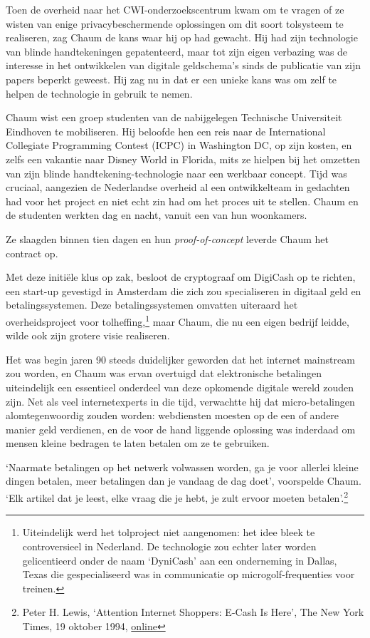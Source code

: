 \documentclass[
  a5paper,
  smalldemyvopaper,11pt,twoside,onecolumn,openright,extrafontsizes]{memoir}
\begin{document}
Toen de overheid naar het CWI-onderzoekscentrum kwam om te vragen of ze
wisten van enige privacybeschermende oplossingen om dit soort tolsysteem
te realiseren, zag Chaum de kans waar hij op had gewacht. Hij had zijn
technologie van blinde handtekeningen gepatenteerd, maar tot zijn eigen
verbazing was de interesse in het ontwikkelen van digitale geldschema's
sinds de publicatie van zijn papers beperkt geweest. Hij zag nu in dat
er een unieke kans was om zelf te helpen de technologie in gebruik te
nemen.

Chaum wist een groep studenten van de nabijgelegen Technische
Universiteit Eindhoven te mobiliseren. Hij beloofde hen een reis naar de
International Collegiate Programming Contest (ICPC) in Washington DC, op
zijn kosten, en zelfs een vakantie naar Disney World in Florida, mits ze
hielpen bij het omzetten van zijn blinde handtekening-technologie naar
een werkbaar concept. Tijd was cruciaal, aangezien de Nederlandse
overheid al een ontwikkelteam in gedachten had voor het project en niet
echt zin had om het proces uit te stellen. Chaum en de studenten werkten
dag en nacht, vanuit een van hun woonkamers.

Ze slaagden binnen tien dagen en hun \emph{proof-of-concept} leverde
Chaum het contract op.

Met deze initiële klus op zak, besloot de cryptograaf om DigiCash op te
richten, een start-up gevestigd in Amsterdam die zich zou specialiseren
in digitaal geld en betalingssystemen. Deze betalingssystemen omvatten
uiteraard het overheidsproject voor tolheffing,\footnote{Uiteindelijk
  werd het tolproject niet aangenomen: het idee bleek te controversieel
  in Nederland. De technologie zou echter later worden gelicentieerd
  onder de naam `DyniCash' aan een onderneming in Dallas, Texas die
  gespecialiseerd was in communicatie op microgolf-frequenties voor
  treinen.} maar Chaum, die nu een eigen bedrijf leidde, wilde ook zijn
grotere visie realiseren.

Het was begin jaren 90 steeds duidelijker geworden dat het internet
mainstream zou worden, en Chaum was ervan overtuigd dat elektronische
betalingen uiteindelijk een essentieel onderdeel van deze opkomende
digitale wereld zouden zijn. Net als veel internetexperts in die tijd,
verwachtte hij dat micro-betalingen alomtegenwoordig zouden worden:
webdiensten moesten op de een of andere manier geld verdienen, en de
voor de hand liggende oplossing was inderdaad om mensen kleine bedragen
te laten betalen om ze te gebruiken.

`Naarmate betalingen op het netwerk volwassen worden, ga je voor
allerlei kleine dingen betalen, meer betalingen dan je vandaag de dag
doet', voorspelde Chaum. `Elk artikel dat je leest, elke vraag die je
hebt, je zult ervoor moeten betalen'.\footnote{Peter H. Lewis,
  `Attention Internet Shoppers: E-Cash Is Here', The New York Times, 19
  oktober 1994,
  \href{https://www.nytimes.com/1994/10/19/business/attention-internet-shoppers-e-cash-is-here.html}{online}}
\end{document}
